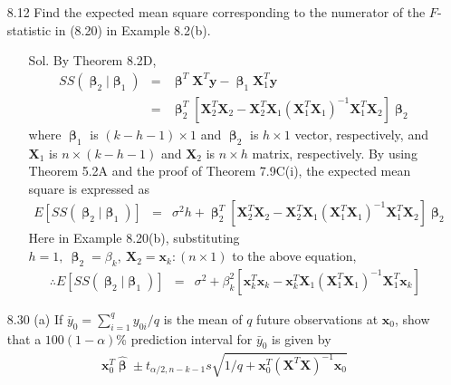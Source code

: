 \documentclass[12pt]{article} %
\begin{document}
\begin{enumerate}
	\item[8.12] Find the expected mean square corresponding to the numerator of the 
	$F$-statistic in (8.20) in Example 8.2(b).
	 \begin{itemize}
	  \item[Sol.] By Theorem 8.2D, 
	   \begin{eqnarray*}
	    SS(\pmb{\upbeta}_{2}|\pmb{\upbeta}_{1})&=&
	    \pmb{\upbeta}^{T}\mathbf{X}^{T}\mathbf{y}-\pmb{\upbeta}_{1}\mathbf{X}_{1}^{T}\mathbf{y}\\
	    &=&
	    \pmb{\upbeta}_{2}^{T}[\mathbf{X}_{2}^{T}\mathbf{X}_{2}-\mathbf{X}_{2}^{T}
	    \mathbf{X}_{1}(\mathbf{X}_{1}^{T}\mathbf{X}_{1})^{-1}\mathbf{X}_{1}^{T}\mathbf{X}_{2}]\pmb{\upbeta}_{2}
	   \end{eqnarray*}
	   where $\pmb{\upbeta}_{1}$ is $(k-h-1)\times 1$ and $\pmb{\upbeta}_{2}$ is $h \times 1$ vector, 
	   respectively, and $\mathbf{X}_{1}$ is $n \times (k-h-1)$ and $\mathbf{X}_{2}$ is $n \times h$ matrix, 
	   respectively. By using Theorem 5.2A and the proof of Theorem 7.9C(i), the expected mean square
	   is expressed as
	   \begin{eqnarray*}
	    E[SS(\pmb{\upbeta}_{2}|\pmb{\upbeta}_{1})]&=&
	    \sigma^{2}h+\pmb{\upbeta}_{2}^{T}[\mathbf{X}_{2}^{T}\mathbf{X}_{2}-\mathbf{X}_{2}^{T}
	    \mathbf{X}_{1}(\mathbf{X}_{1}^{T}\mathbf{X}_{1})^{-1}\mathbf{X}_{1}^{T}\mathbf{X}_{2}]\pmb{\upbeta}_{2}
	   \end{eqnarray*}    
	   Here in Example 8.20(b), substituting $h=1,~\pmb{\upbeta}_{2}=\beta_{k},~\mathbf{X}_{2}=\mathbf{x}_{k}:(n \times 1)$
	   to the above equation, 
	   \begin{eqnarray*}
	    \therefore E[SS(\pmb{\upbeta}_{2}|\pmb{\upbeta}_{1})]&=&\sigma^{2}+\beta_{k}^{2}
	    [\mathbf{x}_{k}^{T}\mathbf{x}_{k}-\mathbf{x}_{k}^{T}
	    \mathbf{X}_{1}(\mathbf{X}_{1}^{T}\mathbf{X}_{1})^{-1}\mathbf{X}_{1}^{T}\mathbf{x}_{k}]
	   \end{eqnarray*}
	 \end{itemize}	 
	\item[8.30] (a) If $\bar{y}_{0}=\sum_{i=1}^{q}y_{0i}/q$ is the mean of $q$ future 
	observations at $\mathbf{x}_{0}$, show that a $100(1-\alpha)$\% prediction interval 
	for $\bar{y}_{0}$ is given by
	\begin{eqnarray*}
	 \mathbf{x}_{0}^{T}\hat{\pmb{\upbeta}}\pm t_{\alpha /2,n-k-1}
	 s\sqrt{1/q+\mathbf{x}^{T}_{0}(\mathbf{X}^{T}\mathbf{X})^{-1}\mathbf{x}_{0}}
	\end{eqnarray*}

\end{enumerate}
\end{document}
